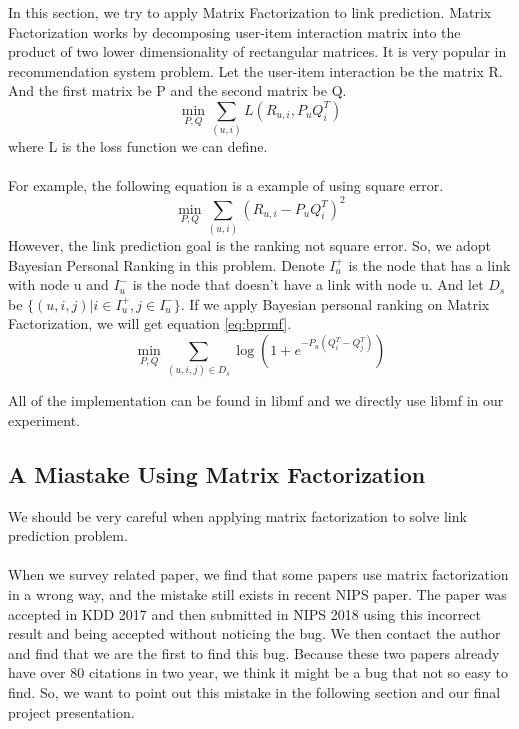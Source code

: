 \documentclass[12pt]{article}
\begin{document}
In this section, we try to apply Matrix Factorization to link prediction. Matrix Factorization works by decomposing user-item interaction matrix into the product of two lower dimensionality of rectangular matrices. It is very popular in recommendation system problem. Let the user-item interaction be the matrix R. And the first matrix be P and the second matrix be Q.  
\\
\begin{equation}
\min_{P,Q}{\sum_{(u,i)}{L(R_{u,i}, P_uQ_i^T)}}
\end{equation}
where L is the loss function we can define. \\
\\
For example, the following equation is a example of using square error. \\
\begin{equation}
\min_{P,Q}{\sum_{(u,i)}{(R_{u,i}-P_uQ_i^T)^2}}
\end{equation}
However, the link prediction goal is the ranking not square error. So, we adopt Bayesian Personal Ranking\cite{bpr} in this problem. Denote $I_u^+$ is the node that has a link with node u and $I_u^-$ is the node that doesn't have a link with node u. And let $D_s$ be $\{(u,i,j)|i \in I_u^+, j \in I_u^-\}$. If we apply Bayesian personal ranking on Matrix Factorization, we will get equation \ref{eq:bprmf}.
\begin{equation}
\min_{P,Q} \sum_{(u,i,j)\in D_s}\log(1+e^{-P_u(Q_i^T - Q_j^T)})
\label{eq:bprmf}
\end{equation}

All of the implementation can be found in libmf\cite{libmf} and we directly use libmf in our experiment.

\subsection{A Miastake Using Matrix Factorization}
We should be very careful when applying matrix factorization to solve link prediction problem.
\\ \\
When we survey related paper, we find that some papers use matrix factorization in a wrong way, and the mistake still exists in recent NIPS paper. The paper was accepted in KDD 2017 and then submitted in NIPS 2018 using this incorrect result and being accepted without noticing the bug. We then contact the author and find that we are the first to find this bug. Because these two papers already have over 80 citations in two year, we think it might be a bug that not so easy to find. So, we want to point out this mistake in the following section and our final project presentation.   
\end{document}

